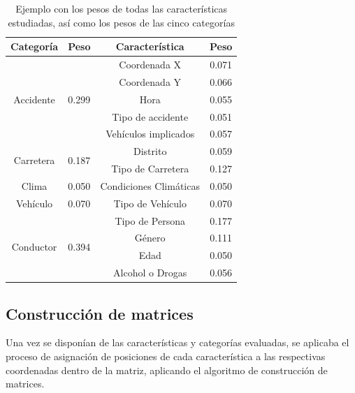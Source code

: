 \begin{table}[ht]
	\caption{Ejemplo con los pesos de todas las características estudiadas, así como los pesos de las cinco categorías}
	\centering
	\begin{tabular}{ |c|c||c|c| }
		\hline
		\textbf{Categoría} & \textbf{Peso} & \textbf{Característica} & \textbf{Peso}\\
		\hline
		\hline
		\multirow{5}{*}{Accidente}   & \multirow{5}{*}{0.299} & Coordenada X & 0.071\\
		&  & Coordenada Y  & 0.066\\
		&  & Hora & 0.055\\
		&  & Tipo de accidente  & 0.051\\
		&  & Vehículos implicados & 0.057\\
		\hline
		
		\multirow{2}{*}{Carretera} & \multirow{2}{*}{0.187} & Distrito  & 0.059\\      
		&  & Tipo de Carretera & 0.127\\
		\hline
		
		\multirow{1}{*}{Clima}  & \multirow{1}{*}{0.050}  & Condiciones Climáticas  & 0.050\\
		\hline
		
		\multirow{1}{*}{Vehículo}  & \multirow{1}{*}{0.070} & Tipo de Vehículo  & 0.070\\
		\hline
		
		\multirow{4}{*}{Conductor}   & \multirow{4}{*}{0.394} & Tipo de Persona & 0.177\\
		&      & Género      & 0.111\\
		&      & Edad      & 0.050\\
		&      & Alcohol o Drogas  & 0.056\\
		\hline
		
	\end{tabular}

	\label{1stPaperWeightsFinalCharacteristics}
\end{table}

\subsection*{Construcción de matrices}


Una vez se disponían de las características y categorías evaluadas, se aplicaba el proceso de asignación de posiciones de cada característica a las respectivas coordenadas dentro de la matriz, aplicando el algoritmo de construcción de matrices.

